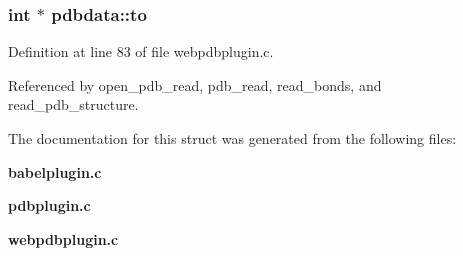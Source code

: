 \subsubsection{\setlength{\rightskip}{0pt plus 5cm}int $\ast$ pdbdata::to}\label{structpdbdata_m14}




Definition at line 83 of file webpdbplugin.c.

Referenced by open\_\-pdb\_\-read, pdb\_\-read, read\_\-bonds, and read\_\-pdb\_\-structure.

The documentation for this struct was generated from the following files:\begin{CompactItemize}
\item 
{\bf babelplugin.c}\item 
{\bf pdbplugin.c}\item 
{\bf webpdbplugin.c}\end{CompactItemize}
